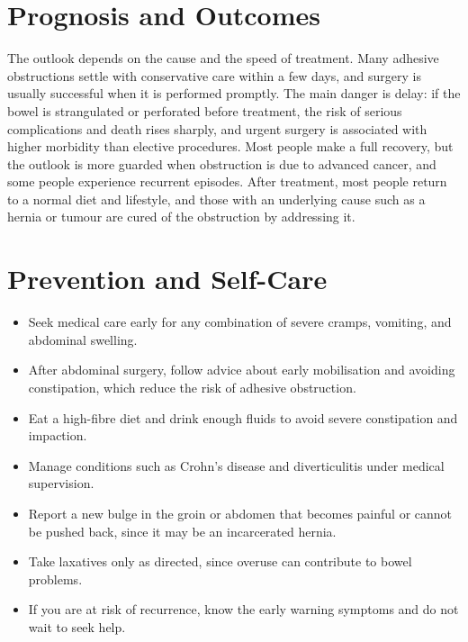 \section*{Prognosis and Outcomes}
The outlook depends on the cause and the speed of treatment. Many adhesive obstructions settle with conservative care within a few days, and surgery is usually successful when it is performed promptly. The main danger is delay: if the bowel is strangulated or perforated before treatment, the risk of serious complications and death rises sharply, and urgent surgery is associated with higher morbidity than elective procedures. Most people make a full recovery, but the outlook is more guarded when obstruction is due to advanced cancer, and some people experience recurrent episodes. After treatment, most people return to a normal diet and lifestyle, and those with an underlying cause such as a hernia or tumour are cured of the obstruction by addressing it.

\section*{Prevention and Self-Care}
\begin{itemize}
    \item Seek medical care early for any combination of severe cramps, vomiting, and abdominal swelling.
    \item After abdominal surgery, follow advice about early mobilisation and avoiding constipation, which reduce the risk of adhesive obstruction.
    \item Eat a high-fibre diet and drink enough fluids to avoid severe constipation and impaction.
    \item Manage conditions such as Crohn's disease and diverticulitis under medical supervision.
    \item Report a new bulge in the groin or abdomen that becomes painful or cannot be pushed back, since it may be an incarcerated hernia.
    \item Take laxatives only as directed, since overuse can contribute to bowel problems.
    \item If you are at risk of recurrence, know the early warning symptoms and do not wait to seek help.
\end{itemize}

